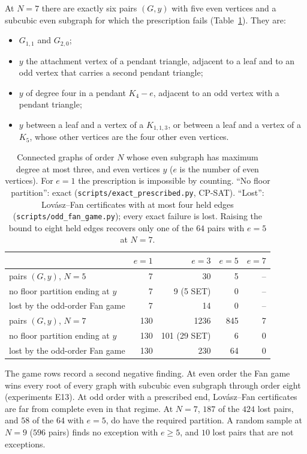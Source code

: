 \documentclass[11pt]{amsart}
\theoremstyle{definition}
\begin{document}
At $N=7$ there are exactly six pairs $(G,y)$ with five even vertices and a subcubic even subgraph
for which the prescription fails (Table~\ref{tab:census}). They are:
\begin{itemize}
\item $G_{1,1}$ and $G_{2,0}$;
\item $y$ the attachment vertex of a pendant triangle, adjacent to a leaf and to an odd vertex that
carries a second pendant triangle;
\item $y$ of degree four in a pendant $K_4-e$, adjacent to an odd vertex with a pendant triangle;
\item $y$ between a leaf and a vertex of a $K_{1,1,3}$, or between a leaf and a vertex of a $K_5$,
whose other vertices are the four other even vertices.
\end{itemize}

\begin{table}[ht]
\centering
\begin{tabular}{lrrrr}
\toprule
& $e=1$ & $e=3$ & $e=5$ & $e=7$\\
\midrule
pairs $(G,y)$, $N=5$ & 7 & 30 & 5 & -- \\
\quad no floor partition ending at $y$ & 7 & 9 (5 SET) & 0 & -- \\
\quad lost by the odd-order Fan game & 7 & 14 & 0 & -- \\
pairs $(G,y)$, $N=7$ & 130 & 1236 & 845 & 7 \\
\quad no floor partition ending at $y$ & 130 & 101 (29 SET) & 6 & 0 \\
\quad lost by the odd-order Fan game & 130 & 230 & 64 & 0 \\
\bottomrule
\end{tabular}
\caption{Connected graphs of order $N$ whose even subgraph has maximum degree at most three, and
even vertices $y$ ($e$ is the number of even vertices). For $e=1$ the prescription is impossible by
counting. ``No floor partition'': exact (\texttt{scripts/exact\_prescribed.py}, CP-SAT). ``Lost'':
Lov\'asz--Fan certificates with at most four held edges (\texttt{scripts/odd\_fan\_game.py}); every
exact failure is lost. Raising the bound to eight held edges recovers only one of the $64$ pairs with
$e=5$ at $N=7$.}\label{tab:census}
\end{table}

The game rows record a second negative finding. At even order the Fan game wins every root of every
graph with subcubic even subgraph through order eight (experiments E13). At odd order with a
prescribed end, Lov\'asz--Fan certificates are far from complete even in that regime. At $N=7$, $187$
of the $424$ lost pairs, and $58$ of the $64$ with $e=5$, do have the required partition. A random
sample at $N=9$ ($596$ pairs) finds no exception with $e\ge5$, and $10$ lost pairs that are not
exceptions.
\end{document}
